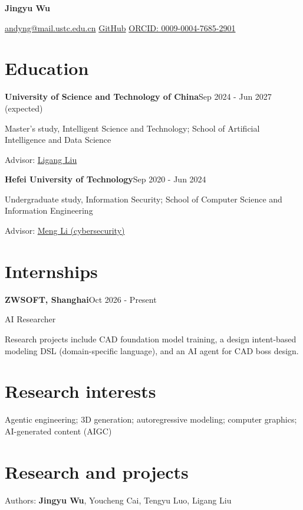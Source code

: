 \documentclass[11pt,a4paper]{article}
\begin{document}
\fontsize{10.5}{12.3}\selectfont
{\fontsize{25}{29}\selectfont\bfseries Jingyu Wu}

\href{mailto:andyng@mail.ustc.edu.cn}{andyng@mail.ustc.edu.cn}\quad
\href{https://github.com/spaceboy202105}{GitHub}\quad
\href{https://orcid.org/0009-0004-7685-2901}{ORCID: 0009-0004-7685-2901}

\section{Education}
\textbf{University of Science and Technology of China}\hfill Sep 2024 - Jun 2027 (expected)

Master's study, Intelligent Science and Technology; School of Artificial Intelligence and Data Science

Advisor: \href{http://staff.ustc.edu.cn/~lgliu/}{Ligang Liu}

\textbf{Hefei University of Technology}\hfill Sep 2020 - Jun 2024

Undergraduate study, Information Security; School of Computer Science and Information Engineering

Advisor: \href{https://faculty.hfut.edu.cn/limeng/zh_CN/}{Meng Li (cybersecurity)}

\section{Internships}
\textbf{ZWSOFT, Shanghai}\hfill Oct 2026 - Present

AI Researcher

Research projects include CAD foundation model training, a design intent-based modeling DSL (domain-specific language), and an AI agent for CAD boss design.

\section{Research interests}
Agentic engineering; 3D generation; autoregressive modeling; computer graphics; AI-generated content (AIGC)

\section{Research and projects}
Authors: \textbf{Jingyu Wu}, Youcheng Cai, Tengyu Luo, Ligang Liu
\end{document}
